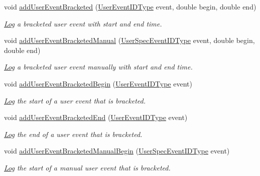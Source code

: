 \begin{DoxyCompactItemize}
void \hyperlink{structvt_1_1trace_1_1_trace_ae57a7ff5517a5bc0694677f10810b545}{add\+User\+Event\+Bracketed} (\hyperlink{namespacevt_1_1trace_a5908920d051c144c89f17c69ed262350}{User\+Event\+I\+D\+Type} event, double begin, double end)
\begin{DoxyCompactList}\small\item\em \hyperlink{structvt_1_1trace_1_1_log}{Log} a bracketed user event with start and end time. \end{DoxyCompactList}\item 
void \hyperlink{structvt_1_1trace_1_1_trace_ab0dd676ca3870682b0c52669d3603c11}{add\+User\+Event\+Bracketed\+Manual} (\hyperlink{namespacevt_1_1trace_a70c43e0e1596eea236912d4197d3120a}{User\+Spec\+Event\+I\+D\+Type} event, double begin, double end)
\begin{DoxyCompactList}\small\item\em \hyperlink{structvt_1_1trace_1_1_log}{Log} a bracketed user event manually with start and end time. \end{DoxyCompactList}\item 
void \hyperlink{structvt_1_1trace_1_1_trace_a1264ea508298bfeb6a6ef5e06d9214f9}{add\+User\+Event\+Bracketed\+Begin} (\hyperlink{namespacevt_1_1trace_a5908920d051c144c89f17c69ed262350}{User\+Event\+I\+D\+Type} event)
\begin{DoxyCompactList}\small\item\em \hyperlink{structvt_1_1trace_1_1_log}{Log} the start of a user event that is bracketed. \end{DoxyCompactList}\item 
void \hyperlink{structvt_1_1trace_1_1_trace_a9ed44cd0fb5939013ae30de2aeb8aa0e}{add\+User\+Event\+Bracketed\+End} (\hyperlink{namespacevt_1_1trace_a5908920d051c144c89f17c69ed262350}{User\+Event\+I\+D\+Type} event)
\begin{DoxyCompactList}\small\item\em \hyperlink{structvt_1_1trace_1_1_log}{Log} the end of a user event that is bracketed. \end{DoxyCompactList}\item 
void \hyperlink{structvt_1_1trace_1_1_trace_ab6def24560e35a011beb771b2a05894c}{add\+User\+Event\+Bracketed\+Manual\+Begin} (\hyperlink{namespacevt_1_1trace_a70c43e0e1596eea236912d4197d3120a}{User\+Spec\+Event\+I\+D\+Type} event)
\begin{DoxyCompactList}\small\item\em \hyperlink{structvt_1_1trace_1_1_log}{Log} the start of a manual user event that is bracketed. \end{DoxyCompactList}\item 

\end{DoxyCompactItemize}
